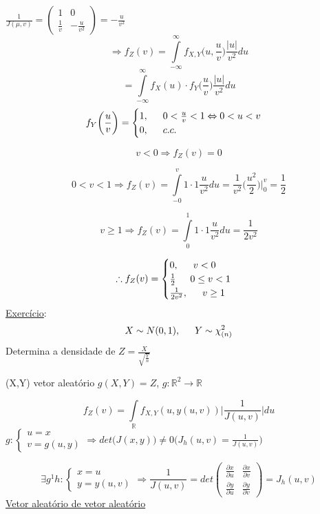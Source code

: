 \documentclass[a4paper,12pt]{article}
\begin{document}
	$
	\frac{1}{J(\mu,v)}=\begin{pmatrix}
	1 & 0\\
	\frac{1}{v} & -\frac{u}{v^2}
	\end{pmatrix} = -\frac{u}{v^2}
	$
	\\
	$$\Rightarrow f_Z(v)= \int\limits_{-\infty}^{\infty}f_{X,Y}\bigg(u,\frac{u}{v}\bigg)  \frac{|u|}{v^2}du$$
	$$=\int\limits_{-\infty}^{\infty}f_X(u)\cdot f_Y\bigg(\frac{u}{v}\bigg)   \frac{|u|}{v^2}du$$
	$$f_Y\bigg(\frac{u}{v}\bigg) = \begin{cases}
	1, \indent 0<\frac{u}{v}<1 \Leftrightarrow 0<u<v\\
	0, \indent c.c.
	\end{cases} $$
	
	$$v<0 \Rightarrow f_Z(v)=0 $$
	
	$$0<v<1\Rightarrow f_Z(v) = \int\limits_{-0}^{v} 1\cdot 1 \frac{u}{v^2} du = \frac{1}{v^2}\bigg(\frac{u^2}{2}\bigg)\bigg|_0^v=\frac{1}{2}$$
	
	$$v\ge 1 \Rightarrow f_Z(v) = \int\limits_{0}^{1} 1\cdot 1 \frac{u}{v^2}du = \frac{1}{2v^2}$$
	
	$$\therefore f_Z(v)=\begin{cases}
	0,\indent v<0\\
	\frac{1}{2 } \indent 0\le v<1\\
	\frac{1}{2v^2},\indent v\ge 1
	\end{cases} $$
	\newpage
	\underline{Exercício}:
	$$X\sim N(0,1),\indent Y\sim \chi^2_{(n)} $$
	Determina a densidade de $Z=\frac{X}{\sqrt{\frac{Y}{n}}}$ 
	
	
	
	\newpage
	
	(X,Y) vetor aleatório $g(X,Y)=Z$, $g:\mathbb R^2\rightarrow \mathbb R$
	
	$$f_Z(v)= \int\limits_{\mathbb R} f_{X,Y}(u,y(u,v))\bigg|\frac{1}{J(u,v)}\bigg|du $$
	$g:\begin{cases}
	u=x\\
	v=g(u,y)
	\end{cases}
	\Rightarrow det\bigg(J(x,y)\bigg)\ne 0 \bigg(J_h(u,v)=\frac{1}{J(u,v)}\bigg)
	$
	
	$$\exists g^{1}h:\begin{cases}
	x=u\\
	y=y(u,v)
	\end{cases} 
	\Rightarrow 
	\frac{1}{J(u,v)}=det\begin{pmatrix}
	\frac{\partial x}{\partial u}& \frac{\partial x}{\partial v}  \\
		\frac{\partial y}{\partial u}& \frac{\partial y}{\partial v}  
	\end{pmatrix}=J_h(u,v)
	$$
	\newpage
	\underline{Vetor aleatório de vetor aleatório}
	
\end{document}
